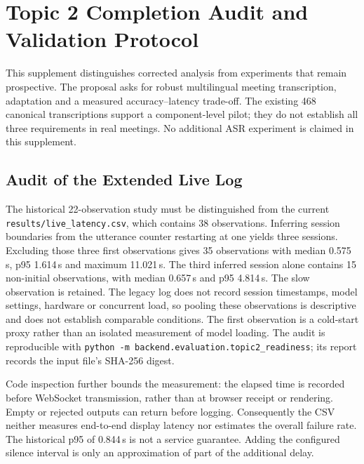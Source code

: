 \section*{Topic 2 Completion Audit and Validation Protocol}
{}

This supplement distinguishes corrected analysis from experiments that remain
prospective. The proposal asks for robust multilingual meeting transcription,
adaptation and a measured accuracy--latency trade-off. The existing 468 canonical
transcriptions support a component-level pilot; they do not establish all three
requirements in real meetings. No additional ASR experiment is claimed in this
supplement.

\subsection*{Audit of the Extended Live Log}
The historical 22-observation study must be distinguished from the current
\texttt{results/\allowbreak live\_\allowbreak latency.csv}, which contains 38 observations. Inferring
session boundaries from the utterance counter restarting at one yields three
sessions. Excluding those three first observations gives 35 observations with
median 0.575\,s, p95 1.614\,s and maximum 11.021\,s. The third inferred session
alone contains 15 non-initial observations, with median 0.657\,s and p95
4.814\,s. The slow observation is retained. The legacy log does not record
session timestamps, model settings, hardware or concurrent load, so pooling
these observations is descriptive and does not establish comparable conditions.
The first observation is a cold-start proxy rather than an isolated measurement
of model loading. The audit is reproducible with
\texttt{python -m backend.\allowbreak evaluation.\allowbreak topic2\_\allowbreak readiness}; its report records the
input file's SHA-256 digest.

Code inspection further bounds the measurement: the elapsed time is recorded
before WebSocket transmission, rather than at browser receipt or rendering.
Empty or rejected outputs can return before logging. Consequently the CSV
neither measures end-to-end display latency nor estimates the overall failure
rate. The historical p95 of 0.844\,s is not a service guarantee. Adding the
configured silence interval is only an approximation of part of the additional
delay.

